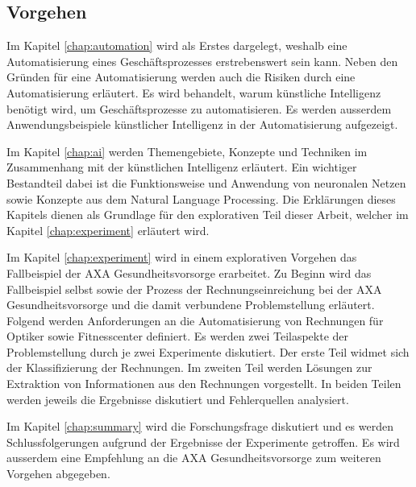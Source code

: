 


\subsection{Vorgehen}

Im Kapitel \ref{chap:automation} wird als Erstes dargelegt, weshalb eine Automatisierung eines Geschäftsprozesses erstrebenswert sein kann. Neben den Gründen für eine Automatisierung werden auch die Risiken durch eine Automatisierung erläutert. Es wird behandelt, warum künstliche Intelligenz benötigt wird, um Geschäftsprozesse zu automatisieren. Es werden ausserdem Anwendungsbeispiele künstlicher Intelligenz in der Automatisierung aufgezeigt.

Im Kapitel \ref{chap:ai} werden Themengebiete, Konzepte und Techniken im Zusammenhang mit der künstlichen Intelligenz erläutert. Ein wichtiger Bestandteil dabei ist die Funktionsweise und Anwendung von neuronalen Netzen sowie Konzepte aus dem Natural Language Processing. Die Erklärungen dieses Kapitels dienen als Grundlage für den explorativen Teil dieser Arbeit, welcher im Kapitel \ref{chap:experiment} erläutert wird.

Im Kapitel \ref{chap:experiment} wird in einem explorativen Vorgehen das Fallbeispiel der AXA Gesundheits\-vorsorge erarbeitet. Zu Beginn wird das Fallbeispiel selbst sowie der Prozess der Rechnungseinreichung bei der AXA Gesundheitsvorsorge und die damit verbundene Problemstellung erläutert. Folgend werden Anforderungen an die Automatisierung von Rechnungen für Optiker sowie Fitnesscenter definiert. Es werden zwei Teilaspekte der Problemstellung durch je zwei Experimente diskutiert. Der erste Teil widmet sich der Klassifizierung der Rechnungen. Im zweiten Teil werden Lösungen zur Extraktion von Informationen aus den Rechnungen vorgestellt. In beiden Teilen werden jeweils die Ergebnisse diskutiert und Fehlerquellen analysiert. 

Im Kapitel \ref{chap:summary} wird die Forschungsfrage diskutiert und es werden Schlussfolgerungen aufgrund der Ergebnisse der Experimente getroffen. Es wird ausserdem eine Empfehlung an die AXA Gesundheitsvorsorge zum weiteren Vorgehen abgegeben.

